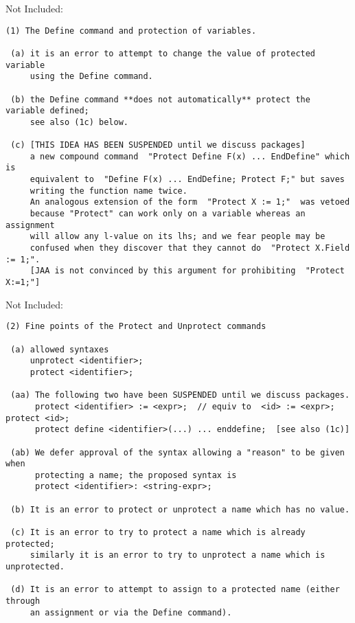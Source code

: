 \documentclass{book}[12,a4paper]
\def\refandpage#1{{\ref{#1}, pg.\pageref{#1}}}
\begin{document}
Not Included: %
\begin{verbatim}
(1) The Define command and protection of variables.

 (a) it is an error to attempt to change the value of protected variable
     using the Define command.

 (b) the Define command **does not automatically** protect the variable defined;
     see also (1c) below.

 (c) [THIS IDEA HAS BEEN SUSPENDED until we discuss packages]
     a new compound command  "Protect Define F(x) ... EndDefine" which is
     equivalent to  "Define F(x) ... EndDefine; Protect F;" but saves
     writing the function name twice.
     An analogous extension of the form  "Protect X := 1;"  was vetoed
     because "Protect" can work only on a variable whereas an assignment
     will allow any l-value on its lhs; and we fear people may be
     confused when they discover that they cannot do  "Protect X.Field := 1;".
     [JAA is not convinced by this argument for prohibiting  "Protect X:=1;"]
\end{verbatim}

Not Included: %
\begin{verbatim}
(2) Fine points of the Protect and Unprotect commands

 (a) allowed syntaxes
     unprotect <identifier>;
     protect <identifier>;

 (aa) The following two have been SUSPENDED until we discuss packages.
      protect <identifier> := <expr>;  // equiv to  <id> := <expr>; protect <id>;
      protect define <identifier>(...) ... enddefine;  [see also (1c)]

 (ab) We defer approval of the syntax allowing a "reason" to be given when
      protecting a name; the proposed syntax is
      protect <identifier>: <string-expr>;

 (b) It is an error to protect or unprotect a name which has no value.

 (c) It is an error to try to protect a name which is already protected;
     similarly it is an error to try to unprotect a name which is unprotected.

 (d) It is an error to attempt to assign to a protected name (either through
     an assignment or via the Define command).
\end{verbatim}
\end{document}
